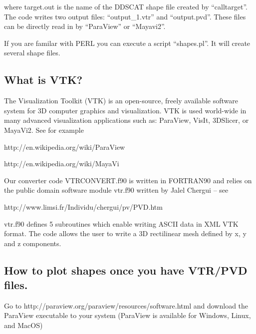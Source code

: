 where target.out is the name of the DDSCAT shape file created by 
``calltarget''.
The code writes two output files: 
{}``output\_1.vtr\textquotedblright{} and {}``output.pvd''.
These files can be directly read in by {}``ParaView'' or {}``Mayavi2''. 

If you are familar with PERL you can execute a script ``shapes.pl''.
It will create several shape files.

\subsection{\label{sec:VTK}
            What is VTK?}

The Visualization Toolkit (VTK) is an open-source, freely available
software system for 3D computer graphics and visualization. VTK is
used world-wide in many advanced visualization applications such as:
ParaView, VisIt, 3DSlicer, or MayaVi2. See for example

\indent\indent http://en.wikipedia.org/wiki/ParaView 

\indent\indent http://en.wikipedia.org/wiki/MayaVi

Our converter code VTRCONVERT.f90 is written in FORTRAN90 
and relies on the public
domain software module vtr.f90 written by Jalel Chergui -- see

\indent\indent http://www.limsi.fr/Individu/chergui/pv/PVD.htm

vtr.f90 defines 5 subroutines which enable writing ASCII data
in XML VTK format. The code allows the user to write a 3D rectilinear mesh
defined by x, y and z components.



\subsection{How to plot shapes once you have VTR/PVD files.}

Go to http://paraview.org/paraview/resources/software.html
and download the ParaView executable to your system 
(ParaView is available for Windows, Linux, and MacOS)

